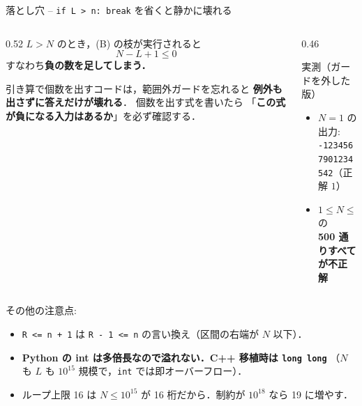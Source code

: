 \documentclass[dvipdfmx,aspectratio=169]{beamer}
\begin{document}
\begin{frame}[fragile]{落とし穴 -- \texttt{if L > n: break} を省くと静かに壊れる}
  \begin{columns}
    \begin{column}{0.52\textwidth}
      $L > N$ のとき，(B) の枝が実行されると
      \[
        N - L + 1 \le 0
      \]
      すなわち\textbf{負の数を足してしまう．}

      \vspace{0.6em}
      引き算で個数を出すコードは，範囲外ガードを忘れると
      \textbf{例外も出さずに答えだけが壊れる}．
      個数を出す式を書いたら
      「\textbf{この式が負になる入力はあるか}」を必ず確認する．
    \end{column}
    \begin{column}{0.46\textwidth}
      \begin{block}{実測（ガードを外した版）}
        \begin{itemize}
          \item $N=1$ の出力: \\ \texttt{-1234567901234542}（正解 $1$）
          \item $1 \le N \le 500$ の\\ \textbf{500 通りすべてが不正解}
        \end{itemize}
      \end{block}
    \end{column}
  \end{columns}

  \vspace{0.5em}
  その他の注意点:
  \begin{itemize}
    \item \verb|R <= n + 1| は \verb|R - 1 <= n| の言い換え（区間の右端が $N$ 以下）．
    \item \textbf{Python の int は多倍長なので溢れない．C++ 移植時は \texttt{long long}}
      （$N$ も $L$ も $10^{15}$ 規模で，\texttt{int} では即オーバーフロー）．
    \item ループ上限 16 は $N \le 10^{15}$ が 16 桁だから．制約が $10^{18}$ なら 19 に増やす．
  \end{itemize}
\end{frame}
\end{document}
